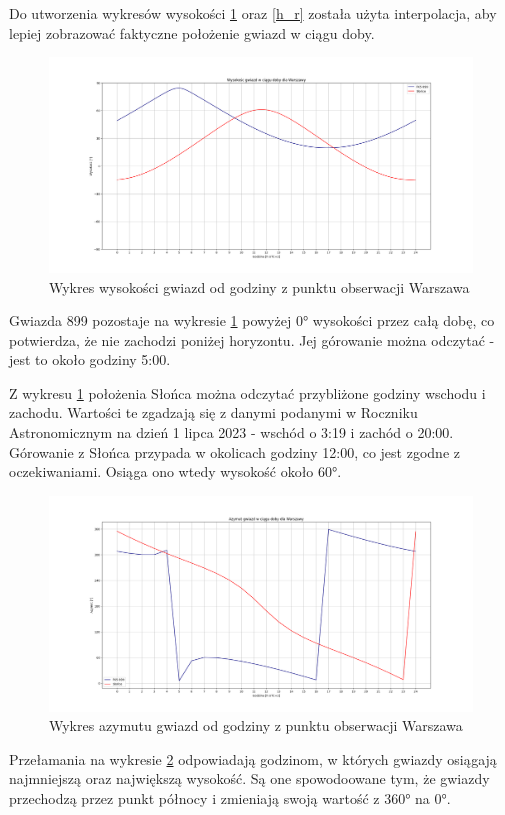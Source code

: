 \documentclass[fleqn,10pt,a4paper]{article}
\begin{document}
Do utworzenia wykresów wysokości \ref{h_wwa} oraz \ref{h_r} została użyta interpolacja, aby lepiej zobrazować faktyczne położenie gwiazd w ciągu doby.

\begin{figure}[h!]
  \centering
  \includegraphics[width=1\textwidth]{zdjecia/wys_gwiazd_wwa_inter.png}
  \caption{Wykres wysokości gwiazd od godziny z punktu obserwacji Warszawa}
  \label{h_wwa}
\end{figure}


Gwiazda 899 pozostaje na wykresie \ref{h_wwa} powyżej 0° wysokości przez całą dobę, co potwierdza, że nie zachodzi poniżej horyzontu.
Jej górowanie można odczytać - jest to około godziny 5:00.

Z wykresu \ref{h_wwa} położenia Słońca można odczytać przybliżone godziny wschodu i zachodu. Wartości te zgadzają się z danymi 
podanymi w Roczniku Astronomicznym na dzień 1 lipca 2023 - wschód o 3:19 i zachód o 20:00. Górowanie z Słońca przypada w okolicach
godziny 12:00, co jest zgodne z oczekiwaniami. Osiąga ono wtedy wysokość około 60°.


\begin{figure}[h!]
  \centering
  \includegraphics[width=1\textwidth]{zdjecia/az_gwiazd_wwa.png}
  \caption{Wykres azymutu gwiazd od godziny z punktu obserwacji Warszawa}
  \label{az_wwa}
\end{figure}
Przełamania na wykresie \ref{az_wwa} odpowiadają godzinom, w których gwiazdy osiągają najmniejszą oraz największą wysokość.
Są one spowodoowane tym, że gwiazdy przechodzą przez punkt północy i zmieniają swoją wartość z 360° na 0°.
\end{document}
